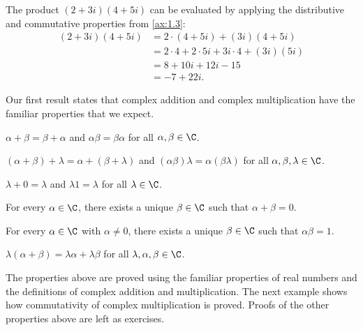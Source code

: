 \begin{example}\label{ax:1.2}
The product $(2+3i)(4+5i)$ can be evaluated by applying the distributive and
commutative properties from \ref{ax:1.3}:
\begin{align*}
(2+3i)(4+5i) &= 2\cdot(4+5i) + (3i)(4+5i)\\
             &= 2\cdot4 + 2\cdot5i + 3i\cdot4 + (3i)(5i)\\
             &= 8 + 10i + 12i - 15\\
             &= -7 + 22i.
\end{align*}
\end{example}

Our first result states that complex addition and complex multiplication have
the familiar properties that we expect.

\begin{result}\label{ax:1.3}\leavevmode
\begin{axprops}
\item[commutativity] $\alpha+\beta=\beta+\alpha$ and $\alpha\beta=\beta\alpha$
  for all $\alpha,\beta\in\C$.
\item[associativity] $(\alpha+\beta)+\lambda=\alpha+(\beta+\lambda)$ and
  $(\alpha\beta)\lambda=\alpha(\beta\lambda)$ for all $\alpha,\beta,\lambda\in\C$.
\item[identities] $\lambda+0=\lambda$ and $\lambda1=\lambda$ for all $\lambda\in\C$.
\item[additive inverse] For every $\alpha\in\C$, there exists a unique
  $\beta\in\C$ such that $\alpha+\beta=0$.
\item[multiplicative inverse] For every $\alpha\in\C$ with $\alpha\ne0$, there
  exists a unique $\beta\in\C$ such that $\alpha\beta=1$.
\item[distributive property] $\lambda(\alpha+\beta)=\lambda\alpha+\lambda\beta$
  for all $\lambda,\alpha,\beta\in\C$.
\end{axprops}
\end{result}

The properties above are proved using the familiar properties of real numbers
and the definitions of complex addition and multiplication. The next example
shows how commutativity of complex multiplication is proved. Proofs of the
other properties above are left as exercises.

